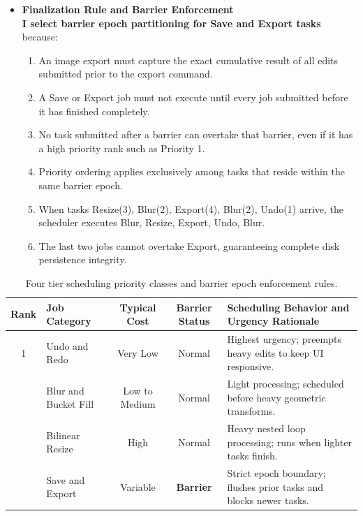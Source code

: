 \documentclass[10pt,a4paper]{article}
\begin{document}
\begin{itemize}[leftmargin=1.2em,noitemsep,topsep=3pt,parsep=2pt]
    \item \textbf{Finalization Rule and Barrier Enforcement}\\[3pt]
    \textbf{I select barrier epoch partitioning for Save and Export tasks} because:
    \begin{enumerate}[label=\arabic*),leftmargin=1.5em,noitemsep,topsep=1pt,parsep=1pt]
        \item An image export must capture the exact cumulative result of all edits submitted prior to the export command.
        \item A Save or Export job must not execute until every job submitted before it has finished completely.
        \item No task submitted after a barrier can overtake that barrier, even if it has a high priority rank such as Priority 1.
        \item Priority ordering applies exclusively among tasks that reside within the same barrier epoch.
        \item When tasks Resize(3), Blur(2), Export(4), Blur(2), Undo(1) arrive, the scheduler executes Blur, Resize, Export, Undo, Blur.
        \item The last two jobs cannot overtake Export, guaranteeing complete disk persistence integrity.
    \end{enumerate}
\end{itemize}

\vspace{0.4cm}
\begin{table}[h!]
\centering
\small
\begin{tabularx}{\textwidth}{c l c c X}
\toprule
\textbf{Rank} & \textbf{Job Category} & \textbf{Typical Cost} & \textbf{Barrier Status} & \textbf{Scheduling Behavior and Urgency Rationale} \\
\midrule
1 & Undo and Redo & Very Low & Normal & Highest urgency; preempts heavy edits to keep UI responsive. \\
\addlinespace[3pt]
2 & Blur and Bucket Fill & Low to Medium & Normal & Light processing; scheduled before heavy geometric transforms. \\
\addlinespace[3pt]
3 & Bilinear Resize & High & Normal & Heavy nested loop processing; runs when lighter tasks finish. \\
\addlinespace[3pt]
4 & Save and Export & Variable & \textbf{Barrier} & Strict epoch boundary; flushes prior tasks and blocks newer tasks. \\
\bottomrule
\end{tabularx}
\caption{Four tier scheduling priority classes and barrier epoch enforcement rules.}
\end{table}
\end{document}
